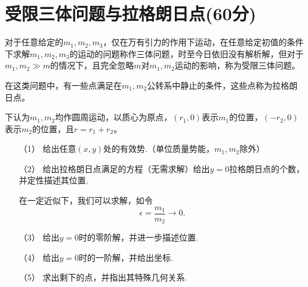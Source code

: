 \documentclass{article}
\begin{document}
\section{受限三体问题与拉格朗日点(60分)}
	对于任意给定的$m_1,m_2,m_3$，仅在万有引力的作用下运动，在任意给定初值的条件下求解$m_1,m_2,m_3$的运动的问题称作三体问题，时至今日依旧没有解析解，但对于$m_1,m_2\gg m$的情况下，且完全忽略$m$对$m_1,m_2$运动的影响，称为受限三体问题。\par
	在这类问题中，有一些点满足在$m_1,m_2$公转系中静止的条件，这些点称为拉格朗日点。\par
	下认为$m_1,m_2$均作圆周运动，以质心为原点，$(r_1,0)$表示$m_1$的位置，$(-r_2,0)$表示$m_2$的位置，且$r=r_1+r_2$。\par
\begin{itemize}
\item[（1）]	给出任意$(x,y)$处的有效势.（单位质量势能，$m_1,m_2$除外）
\item[（2）]	给出拉格朗日点满足的方程（无需求解）给出$y=0$拉格朗日点的个数，并定性描述其位置.\par
在一定近似下，我们可以求解，如令
$$\epsilon=\dfrac{m_1}{m_2}\to 0.$$
\item[（3）]	给出$y=0$时的零阶解，并进一步描述位置.
\item[（4）]	给出$y=0$时的一阶解，并给出坐标.
\item[（5）]	求出剩下的点，并指出其特殊几何关系.
\end{itemize}
\end{document}
